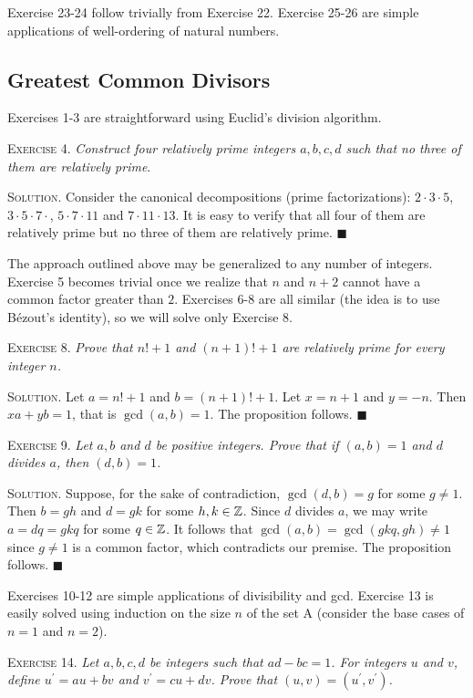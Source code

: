 \documentclass[11pt, leqno]{article}
\newcommand{\done}{\ensuremath{\blacksquare}}
\begin{document}
Exercise 23-24 follow trivially from Exercise 22. Exercise 25-26 are simple applications of well-ordering of natural numbers. 

\subsection{Greatest Common Divisors}

Exercises 1-3 are straightforward using Euclid's division algorithm.

\textsc{Exercise 4}. \emph{Construct four relatively prime integers $a,b,c,d$ such that no three of them are relatively prime}.

\textsc{Solution}. Consider the canonical decompositions (prime factorizations): $2\cdot3\cdot5$,  $3\cdot5\cdot7\cdot$, $5\cdot7\cdot11$ and $7\cdot11\cdot13$. It is easy to verify that all four of them are relatively prime but no three of them are relatively prime. \done

The approach outlined above may be generalized to any number of integers. Exercise 5 becomes trivial once we realize that $n$ and $n+2$ cannot have a common factor greater than $2$. Exercises 6-8 are all similar (the idea is to use B\'ezout's identity), so we will solve only Exercise 8.

\textsc{Exercise 8}. \emph{Prove that $n!+1$ and $(n+1)!+1$ are relatively prime for every integer $n$.}

\textsc{Solution}. Let $a = n!+1$ and $b = (n+1)!+1$. Let $x = n+1$ and $y = -n$. Then $xa + yb = 1$, that is $\gcd(a,b)=1$. The proposition follows. \done

\textsc{Exercise 9}. \emph{Let $a,b$ and $d$ be positive integers. Prove that if $(a,b)=1$ and $d$ divides $a$, then $(d,b)=1$.}

\textsc{Solution}. Suppose, for the sake of contradiction, $\gcd(d,b) = g$ for some $g\ne 1$. Then $b=gh$ and $d=gk$ for some $h,k \in \mathbb{Z}$. Since $d$ divides $a$, we may write $a = dq = gkq$ for some $q\in\mathbb{Z}$. It follows that $\gcd(a,b) = \gcd(gkq, gh) \ne 1$ since $g\ne 1$ is a common factor, which contradicts our premise. The proposition follows. \done

Exercises 10-12 are simple applications of divisibility and gcd. Exercise 13 is easily solved using induction on the size $n$ of the set A (consider the base cases of $n=1$ and $n=2$).

\textsc{Exercise 14}. \emph{Let $a,b,c,d$ be integers such that $ad-bc=1$. For integers $u$ and $v$, define $u^{\prime}=au+bv$ and $v^{\prime}=cu+dv$. Prove that $(u,v)=(u^{\prime},v^{\prime})$.}
\end{document}
